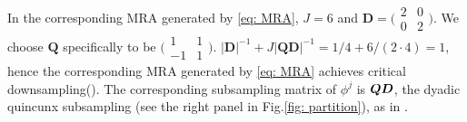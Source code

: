 In the corresponding MRA generated by \eqref{eq: MRA}, $J=6$ and $\mathbf{D} =\bigl(\begin{smallmatrix} 2&0\\0&2\end{smallmatrix}\bigr)$. We choose  $\mathbf{Q}$ specifically to be $\bigl(\begin{smallmatrix} 1&1\\-1&1\end{smallmatrix}\bigr)$.  $ |\mathbf{D}|^{-1} + J|\mathbf{QD}|^{-1} = 1/4 + 6/ (2\cdot 4) = 1$, hence the corresponding MRA generated by \eqref{eq: MRA} achieves critical downsampling(\cite{durand2007}). The corresponding subsampling matrix of $\phi^j$ is $\boldsymbol{QD}$, the dyadic quincunx subsampling (see the right panel in Fig.\ref{fig: partition}), as in \cite{durand2007}. 


